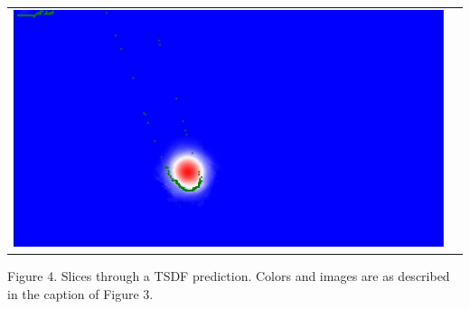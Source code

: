 \documentclass[10pt,onecolumn,letterpaper]{article}
\begin{document}
\begin{tabular}{cc}
\includegraphics[height=\imheight]{real/statue/slice_00200.jpg}
\end{tabular}
\vspace{10pt}

{\centering \small Figure 4. Slices through a TSDF prediction. Colors and images are as described in the caption of Figure 3.}


{\small


}
\end{document}
